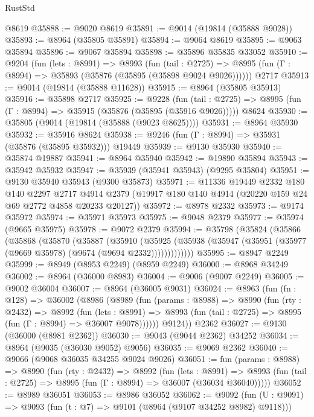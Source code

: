\begin{lexlean}{RustStd}
\begin{coremodule}
    @8619
@35888 := @9020 @8619
@35891 := @9014 (@19814 (@35888 @9028))
@35893 := @8964 (@35805 @35891)
@35894 := @9064 @8619
@35895 := @9063 @35894
@35896 := @9067 @35894
@35898 := @35896 @35835 @33052
@35910 := @9204
    (fun (lets : @8991) =>
    @8993
      (fun (tail : @2725) =>
      @8995 (fun (Γ : @8994) => @35893 (@35876 (@35895 (@35898 @9024 @9026))))))
    @2717
@35913 := @9014 (@19814 (@35888 @11628))
@35915 := @8964 (@35805 @35913)
@35916 := @35898 @2717
@35925 := @9228
    (fun (tail : @2725) => @8995 (fun (Γ : @8994) => @35915 (@35876 (@35895 (@35916 @9026)))))
    @8624
@35930 := @35805 (@9014 (@19814 (@35888 (@9023 @8625))))
@35931 := @8964 @35930
@35932 := @35916 @8624
@35938 := @9246 (fun (Γ : @8994) => @35931 (@35876 (@35895 @35932))) @19449
@35939 := @9130 @35930
@35940 := @35874 @19887
@35941 := @8964 @35940
@35942 := @19890 @35894
@35943 := @35942 @35932
@35947 := @35939 (@35941 @35943) (@9295 @35804)
@35951 := @9130 @35940 @35943 (@9300 @35873)
@35971 := @11336
    @19449
    @2332
    @180
    @140
    @2297
    @2717
    @4914
    @2379
    (@19917 @180 @140 @4914 (@20220 @159 @24 @69 @2772 @4858 @20233 @20127))
@35972 := @8978 @2332
@35973 := @9174 @35972
@35974 := @35971 @35973
@35975 := @9048 @2379
@35977 := @35974 (@9665 @35975)
@35978 := @9072 @2379
@35994 := @35798
    (@35824
      (@35866
        (@35868
          (@35870
            (@35887
              (@35910
                (@35925
                  (@35938 (@35947 (@35951 (@35977 (@9669 @35978) (@9674 (@9694 @2332)))))))))))))
@35995 := @8947 @2249
@35999 := @8949 (@8953 @2249) (@8959 @2249)
@36000 := @8968 @34249
@36002 := @8964 (@36000 @8983)
@36004 := @9006 (@9007 @2249)
@36005 := @9002 @36004
@36007 := @8964 (@36005 @9031)
@36024 := @8963
    (fun (fn : @128) =>
    @36002
      (@8986
        (@8989
          (fun (params : @8988) =>
          @8990
            (fun (rty : @2432) =>
            @8992
              (fun (lets : @8991) =>
              @8993 (fun (tail : @2725) => @8995 (fun (Γ : @8994) => @36007 @9078))))))
        @9124))
    @2362
@36027 := @9130 (@36000 (@8981 @2362))
@36030 := @9043 (@9044 @2362) @34252
@36034 := @8964 (@9035 (@36030 @9052) @9056)
@36035 := @9069 @2362
@36040 := @9066 (@9068 @36035 @34255 @9024 @9026)
@36051 := fun (params : @8988) =>
  @8990
    (fun (rty : @2432) =>
    @8992
      (fun (lets : @8991) =>
      @8993 (fun (tail : @2725) => @8995 (fun (Γ : @8994) => @36007 (@36034 @36040)))))
@36052 := @8989 @36051
@36053 := @8986 @36052
@36062 := @9092
    (fun (U : @9091) => @9093 (fun (t : @7) => @9101 (@8964 (@9107 @34252 @8982) @9118)))

\end{coremodule}
\end{lexlean}
